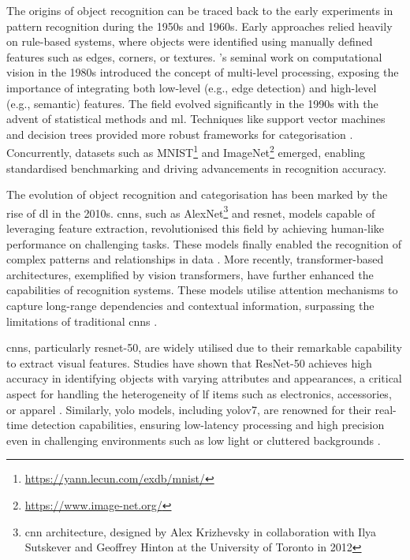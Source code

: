 The origins of object recognition can be traced back to the early experiments in pattern recognition during the 1950s and 1960s. Early approaches relied heavily on rule-based systems, where objects were identified using manually defined features such as edges, corners, or textures. 's seminal work on computational vision in the 1980s introduced the concept of multi-level processing, exposing the importance of integrating both low-level (e.g., edge detection) and high-level (e.g., semantic) features. The field evolved significantly in the 1990s with the advent of statistical methods and \ac{ml}. Techniques like support vector machines and decision trees provided more robust frameworks for categorisation \cite{Bishop2006}. Concurrently, datasets such as MNIST\footnote{\url{https://yann.lecun.com/exdb/mnist/}} and ImageNet\footnote{\url{https://www.image-net.org/}} emerged, enabling standardised benchmarking and driving advancements in recognition accuracy.

The evolution of object recognition and categorisation has been marked by the rise of \ac{dl} in the 2010s. \acp{cnn}, such as AlexNet\footnote{\ac{cnn} architecture, designed by Alex Krizhevsky in collaboration with Ilya Sutskever and Geoffrey Hinton at the University of Toronto in 2012} and \ac{resnet}, models capable of leveraging feature extraction, revolutionised this field by achieving human-like performance on challenging tasks. These models finally enabled the recognition of complex patterns and relationships in data \cites{He2015, Krizhevsky2017}. More recently, transformer-based architectures, exemplified by vision transformers, have further enhanced the capabilities of recognition systems. These models utilise attention mechanisms to capture long-range dependencies and contextual information, surpassing the limitations of traditional \acp{cnn} \cite{Dosovitskiy2020}.

\acp{cnn}, particularly \ac{resnet}-50, are widely utilised due to their remarkable capability to extract visual features. Studies have shown that ResNet-50 achieves high accuracy in identifying objects with varying attributes and appearances, a critical aspect for handling the heterogeneity of \ac{lf} items such as electronics, accessories, or apparel \cites{Prawira2024, Ghazal2016, Liu2022}. Similarly, \ac{yolo} models, including \ac{yolo}v7, are renowned for their real-time detection capabilities, ensuring low-latency processing and high precision even in challenging environments such as low light or cluttered backgrounds \cites{Sharma2024, Vedanth2024}.

